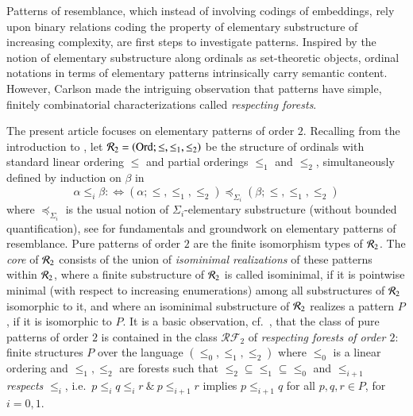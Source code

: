 \documentclass[3p,10pt,times]{elsarticle}
\newcommand{\al}{\alpha}
\newcommand{\be}{\beta}
\newcommand{\On}{{\mathrm{Ord}}}
\newcommand{\leo}{\le_1}
\newcommand{\Rtwo}{{{\cal R}_2}}
\newcommand{\aeq}{\Leftrightarrow}
\newcommand{\andsp}{\:\&\:}
\newcommand{\letwo}{\le_2}
\begin{document}
Patterns of resemblance, which instead of involving codings of embeddings, rely upon binary relations coding the property of elementary 
substructure of increasing complexity, are first steps to investigate patterns.   
Inspired by the notion of elementary substructure along ordinals as set-theoretic objects, ordinal notations
in terms of elementary patterns intrinsically carry semantic content. However, Carlson made the intriguing observation that
patterns have simple, finitely combinatorial characterizations called \emph{respecting forests}.  

The present article focuses on elementary patterns of order $2$. Recalling from the introduction to \cite{W}, let 
$\Rtwo=\left(\On;\le,\leo,\letwo\right)$\index{$\r$@$\Rtwo$} be the structure of ordinals 
with standard linear ordering $\le$ and partial orderings $\le_1$ and $\le_2$, simultaneously defined by induction on $\be$ in  
\[\al\le_i\be:\aeq \left(\al;\le,\le_1,\le_2\right) \preceq_{\Sigma_i} \left(\be;\le,\le_1,\le_2\right)\]
where $\preceq_{\Sigma_i}$ is the usual notion of $\Sigma_i$-elementary substructure (without bounded quantification), see \cite{C99,C01}
for fundamentals and groundwork on elementary patterns of resemblance.
Pure patterns of order $2$ are the finite isomorphism types of $\Rtwo$. The \emph{core}
of $\Rtwo$ consists of the union of \emph{isominimal realizations} of these patterns within $\Rtwo$, where a finite 
substructure of $\Rtwo$ is called isominimal, if it is pointwise minimal (with respect to increasing enumerations) 
among all substructures of $\Rtwo$ isomorphic to it, and where an isominimal substructure of $\Rtwo$ realizes a pattern $P$, if
it is isomorphic to $P$. It is a basic observation, cf.\ \cite{C01}, that the class of pure patterns of order $2$ is 
contained in the class $\mathcal{RF}_2$ of \emph{respecting forests of order $2$}:
finite structures $P$ over the language $(\le_0,\leo,\letwo)$ where $\le_0$ is a linear ordering and $\leo,\letwo$ are forests such that 
$\letwo\subseteq\leo\subseteq\le_0$ and $\le_{i+1}$ \emph{respects} $\le_i$, i.e.\ $p\le_i q\le_i r\andsp p\le_{i+1}r$ implies $p\le_{i+1}q$
for all $p,q,r\in P$, for $i=0,1$.  
\end{document}
